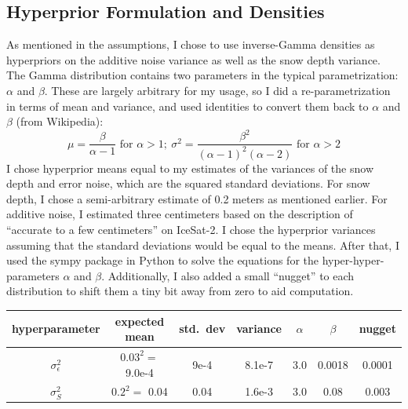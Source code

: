 \documentclass[12pt, letterpaper]{article}
\begin{document}
\newpage
\subsection{Hyperprior Formulation and Densities}
As mentioned in the assumptions, I chose to use inverse-Gamma densities as hyperpriors on the additive noise variance as well as the snow depth variance.
The Gamma distribution contains two parameters in the typical parametrization: $\alpha$ and $\beta$. These are largely arbitrary for my usage,
so I did a re-parametrization in terms of mean and variance, and used identities to convert them back to $\alpha$ and $\beta$ (from Wikipedia):
\[
    \mu = \frac{\beta}{\alpha - 1} \text{ for } \alpha > 1; \>
    \sigma^2 = \frac{\beta^2}{(\alpha-1)^2(\alpha-2)} \text{ for } \alpha > 2
\]
I chose hyperprior means equal to my estimates of the variances of the snow depth and error noise, which are the squared standard deviations.
For snow depth, I chose a semi-arbitrary estimate of 0.2 meters as mentioned earlier. For additive noise, I estimated three centimeters
based on the description of ``accurate to a few centimeters'' on IceSat-2. I chose the hyperprior variances assuming that the standard deviations
would be equal to the means. After that, I used the sympy package in Python to solve the equations for the hyper-hyper-parameters $\alpha$ and $\beta$.
Additionally, I also added a small ``nugget'' to each distribution to shift them a tiny bit away from zero to aid computation.
\medskip
\begin{center}
\begin{tabular} { |c|c|c|c|c|c|c| }

\hline
hyperparameter     &expected mean    &std.\ dev& variance &$\alpha$& $\beta$ & nugget \\
\hline
$\sigma^2_\epsilon$&$0.03^2=$ 9.0e-4 &  9e-4   &  8.1e-7  &  3.0   &  0.0018 & 0.0001 \\
$\sigma^2_S$       &$0.2^2=$ 0.04    &  0.04   &  1.6e-3  &  3.0   &   0.08  &  0.003 \\
\hline

\end{tabular}
\end{center}
\medskip
\end{document}
